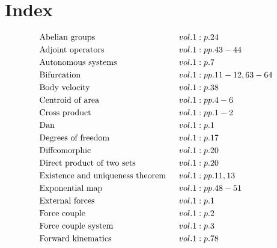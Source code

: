 \documentclass[a4paper]{article}
\begin{document}
 
\section*{Index} 
\allowdisplaybreaks 
\begin{align*} 
&\text{Abelian groups} \hspace*{0.55556em}&& vol. 1: p. 24\\
&\text{Adjoint operators} \hspace*{0.55556em}&& vol. 1: pp. 43-44\\
&\text{Autonomous systems} \hspace*{0.55556em}&& vol. 1: p. 7\\
&\text{Bifurcation} \hspace*{0.55556em}&& vol. 1: pp. 11-12, 63-64\\
&\text{Body velocity} \hspace*{0.55556em}&& vol. 1: p. 38\\
&\text{Centroid of area} \hspace*{0.55556em}&& vol. 1: pp. 4-6\\
&\text{Cross product} \hspace*{0.55556em}&& vol. 1: pp. 1-2\\
&\text{Dan} \hspace*{0.55556em}&& vol. 1: p. 1\\
&\text{Degrees of freedom} \hspace*{0.55556em}&& vol. 1: p. 17\\
&\text{Diffeomorphic} \hspace*{0.55556em}&& vol. 1: p. 20\\
&\text{Direct product of two sets} \hspace*{0.55556em}&& vol. 1: p. 20\\
&\text{Existence and uniqueness theorem} \hspace*{0.55556em}&& vol. 1: pp. 11, 13\\
&\text{Exponential map} \hspace*{0.55556em}&& vol. 1: pp. 48-51\\
&\text{External forces} \hspace*{0.55556em}&& vol. 1: p. 1\\
&\text{Force couple} \hspace*{0.55556em}&& vol. 1: p. 2\\
&\text{Force couple system} \hspace*{0.55556em}&& vol. 1: p. 3\\
&\text{Forward kinematics} \hspace*{0.55556em}&& vol. 1: p. 78\\

\end{align*}
\end{document}
